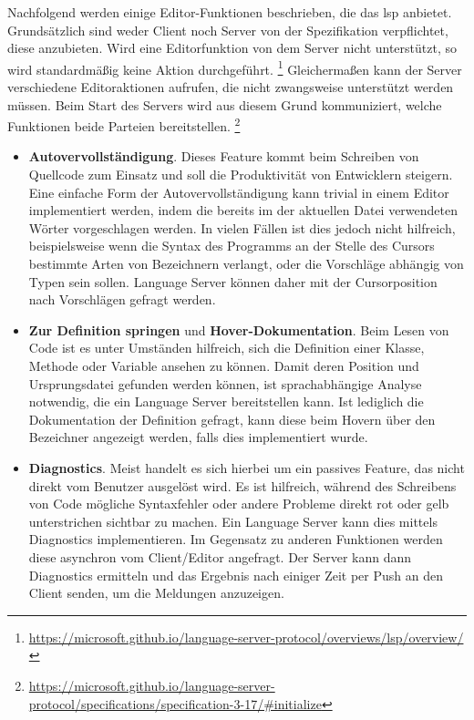 Nachfolgend werden einige Editor-Funktionen beschrieben, die das \ac{lsp} anbietet.
Grundsätzlich sind weder Client noch Server von der Spezifikation verpflichtet, diese anzubieten.
Wird eine Editorfunktion von dem Server nicht unterstützt, so wird standardmäßig keine Aktion durchgeführt.
\footnote{\url{https://microsoft.github.io/language-server-protocol/overviews/lsp/overview/}}
Gleichermaßen kann der Server verschiedene Editoraktionen aufrufen, die nicht zwangsweise unterstützt werden müssen.
Beim Start des Servers wird aus diesem Grund kommuniziert, welche Funktionen beide Parteien bereitstellen.
\footnote{\url{https://microsoft.github.io/language-server-protocol/specifications/specification-3-17/\#initialize}}

\begin{itemize}
    \item \textbf{Autovervollständigung}.
    Dieses Feature kommt beim Schreiben von Quellcode zum Einsatz und soll die Produktivität von Entwicklern steigern.
    Eine einfache Form der Autovervollständigung kann trivial in einem Editor implementiert werden, indem die bereits im der aktuellen Datei verwendeten Wörter vorgeschlagen werden.
    In vielen Fällen ist dies jedoch nicht hilfreich, beispielsweise wenn die Syntax des Programms an der Stelle des Cursors bestimmte Arten von Bezeichnern verlangt, oder die Vorschläge abhängig von Typen sein sollen.
    Language Server können daher mit der Cursorposition nach Vorschlägen gefragt werden.
    \item \textbf{Zur Definition springen} und \textbf{Hover-Dokumentation}.
    Beim Lesen von Code ist es unter Umständen hilfreich, sich die Definition einer Klasse, Methode oder Variable ansehen zu können.
    Damit deren Position und Ursprungsdatei gefunden werden können, ist sprachabhängige Analyse notwendig, die ein Language Server bereitstellen kann.
    Ist lediglich die Dokumentation der Definition gefragt, kann diese beim Hovern über den Bezeichner angezeigt werden, falls dies implementiert wurde.
    \item \textbf{Diagnostics}.
    Meist handelt es sich hierbei um ein passives Feature, das nicht direkt vom Benutzer ausgelöst wird.
    Es ist hilfreich, während des Schreibens von Code mögliche Syntaxfehler oder andere Probleme direkt rot oder gelb unterstrichen sichtbar zu machen.
    Ein Language Server kann dies mittels Diagnostics implementieren.
    Im Gegensatz zu anderen Funktionen werden diese asynchron vom Client/Editor angefragt.
    Der Server kann dann Diagnostics ermitteln und das Ergebnis nach einiger Zeit per Push an den Client senden, um die Meldungen anzuzeigen.

\end{itemize}
